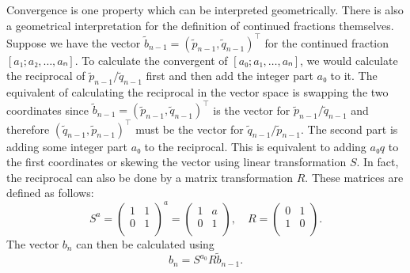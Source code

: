 Convergence is one property which can be interpreted geometrically.
There is also a geometrical interpretation for the definition of continued fractions themselves.
Suppose we have the vector $\tilde b_{n-1} = (\tilde p_{n-1}, \tilde q_{n-1})^⊤$
for the continued fraction $[a₁; a₂, …, aₙ]$.
To calculate the convergent of $[a₀; a₁, …, aₙ]$,
we would calculate the reciprocal of $\tilde p_{n-1} / \tilde q_{n-1}$ first
and then add the integer part $a₀$ to it.
The equivalent of calculating the reciprocal in the vector space is swapping the two coordinates
since $\tilde b_{n-1} = (\tilde p_{n-1}, \tilde q_{n-1})^⊤$ is the vector for $\tilde p_{n-1} / \tilde q_{n-1}$
and therefore $(\tilde q_{n-1}, \tilde p_{n-1})^⊤$ must be the vector for $\tilde q_{n-1} / \tilde p_{n-1}$.
The second part is adding some integer part $a₀$ to the reciprocal.
This is equivalent to adding $a₀ q$ to the first coordinates
or skewing the vector using linear transformation $S$.
In fact, the reciprocal can also be done by a matrix transformation $R$.
These matrices are defined as follows:
\[
  S^a =
  \begin{pmatrix}
    1 & 1 \\
    0 & 1 \\
  \end{pmatrix}^a
  =
  \begin{pmatrix}
    1 & a \\
    0 & 1 \\
  \end{pmatrix},
  \quad
  R =
  \begin{pmatrix}
    0 & 1 \\
    1 & 0 \\
  \end{pmatrix}.
\]
The vector $b_n$ can then be calculated using
\[
  b_n = S^{a_0} R \tilde b_{n-1}.
\]

